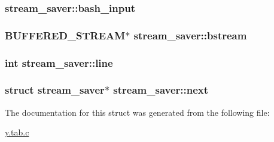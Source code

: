 \subsubsection[{\texorpdfstring{bash\+\_\+input}{bash_input}}]{ stream\+\_\+saver\+::bash\+\_\+input}\hypertarget{structstream__saver_a289a85e33c449e20e186233f355629db}{}\label{structstream__saver_a289a85e33c449e20e186233f355629db}
\subsubsection[{\texorpdfstring{bstream}{bstream}}]{\setlength{\rightskip}{0pt plus 5cm}B\+U\+F\+F\+E\+R\+E\+D\+\_\+\+S\+T\+R\+E\+AM$\ast$ stream\+\_\+saver\+::bstream}\hypertarget{structstream__saver_a16ca697c6be794b7b0d4cc1919c057db}{}\label{structstream__saver_a16ca697c6be794b7b0d4cc1919c057db}
\subsubsection[{\texorpdfstring{line}{line}}]{\setlength{\rightskip}{0pt plus 5cm}int stream\+\_\+saver\+::line}\hypertarget{structstream__saver_ae65e97941be54e749139a5d4722d96d9}{}\label{structstream__saver_ae65e97941be54e749139a5d4722d96d9}
\subsubsection[{\texorpdfstring{next}{next}}]{\setlength{\rightskip}{0pt plus 5cm}struct {\bf stream\+\_\+saver}$\ast$ stream\+\_\+saver\+::next}\hypertarget{structstream__saver_af27ac3238525fc36f8165d8a879c8b68}{}\label{structstream__saver_af27ac3238525fc36f8165d8a879c8b68}


The documentation for this struct was generated from the following file\+:\begin{DoxyCompactItemize}
\item 
\hyperlink{y_8tab_8c}{y.\+tab.\+c}\end{DoxyCompactItemize}
